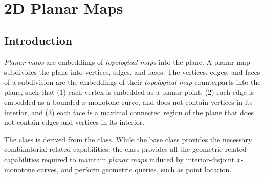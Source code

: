 
\def\Ipe#1{\def\IPEfile{#1}}

\renewcommand{\Re}{{\rm I\!\hspace{-0.025em} R}}

\def\C{{\cal C}}
\def\G{{\cal G}}
\def\F{{\cal F}}
\def\I{{\cal I}}
\def\U{{\cal U}}
\def\M{{\cal M}}
\def\eps{{\varepsilon}}
\def\bd{{\partial}}
\def\dm{{\cal D}}

\chapter{2D Planar Maps}
\label{I1_ChapterPlanarMap}
\minitoc

\section*{Introduction}
\label{PM_sec:intro}

{\em Planar maps} are embeddings of {\em topological maps} into the
plane. A planar map subdivides the plane into vertices, edges, and
faces. The vertices, edges, and faces of a subdivision are the
embeddings of their {\em topological map} counterparts into the plane,
such that (1) each vertex is embedded as a planar point, (2) each edge
is embedded as a bounded $x$-monotone curve, and does not contain
vertices in its interior, and (3) each face is a maximal connected
region of the plane that does not contain edges and vertices in its
interior.

The  class is derived from the
 class. While the
 base class provides the necessary
combinatorial-related capabilities, the
 class provides all the
geometric-related capabilities required to maintain {\em planar maps}
induced by interior-disjoint $x$-monotone curves, and perform
geometric queries, such as point location.

